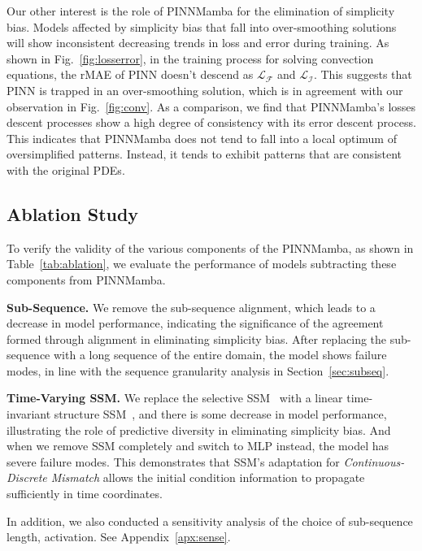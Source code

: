 Our other interest is the role of PINNMamba for the elimination of simplicity bias. Models affected by simplicity bias that fall into over-smoothing solutions will show inconsistent decreasing trends in loss and error during training. 
    As shown in Fig.~\ref{fig:losserror}, in the training process for solving convection equations, the rMAE of PINN doesn't descend as $\mathcal L_\mathcal F$ and $\mathcal L_\mathcal I$. 
        This suggests that PINN is trapped in an over-smoothing solution, which is in agreement with our observation in Fig.~\ref{fig:conv}. 
As a comparison, we find that PINNMamba's losses descent processes show a high degree of consistency with its error descent process. 
    This indicates that PINNMamba does not tend to fall into a local optimum of oversimplified patterns.
        Instead, it tends to exhibit patterns that are consistent with the original PDEs.

\vspace{-2mm}
\subsection{Ablation Study}
\vspace{-1mm}


To verify the validity of the various components of the PINNMamba, as shown in Table~\ref{tab:ablation}, we evaluate the performance of models subtracting these components from PINNMamba.

\textbf{Sub-Sequence.} We remove the sub-sequence alignment, which leads to a decrease in model performance, indicating the significance of the agreement formed through alignment in eliminating simplicity bias.
After replacing the sub-sequence with a long sequence of the entire domain, the model shows failure modes, in line with the sequence granularity analysis in Section~\ref{sec:subseq}.

\textbf{Time-Varying SSM.} We replace the selective SSM~\cite{gu2023mamba} with a linear time-invariant structure SSM~\cite{gu2022efficiently}, and there is some decrease in model performance, illustrating the role of predictive diversity in eliminating simplicity bias. 
And when we remove SSM completely and switch to MLP instead, the model has severe failure modes. 
        This demonstrates that SSM's adaptation for \textit{Continuous-Discrete Mismatch} allows the initial condition information to propagate sufficiently in time coordinates.

In addition, we also conducted a sensitivity analysis of the choice of sub-sequence length, activation. See Appendix~\ref{apx:sense}.

